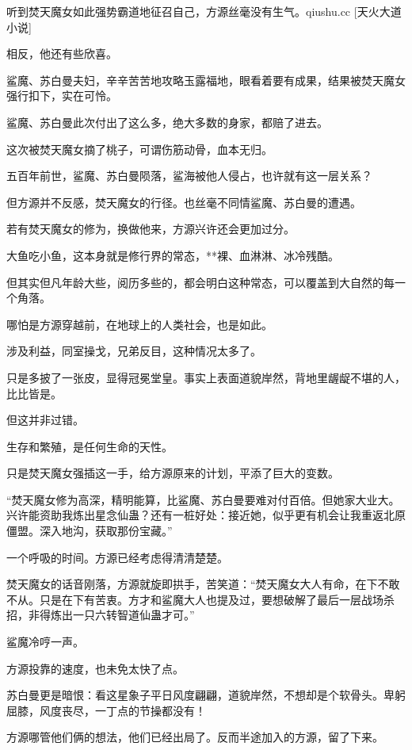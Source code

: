 
\begin{this_body}

听到焚天魔女如此强势霸道地征召自己，方源丝毫没有生气。qiushu.cc [天火大道小说]

相反，他还有些欣喜。

鲨魔、苏白曼夫妇，辛辛苦苦地攻略玉露福地，眼看着要有成果，结果被焚天魔女强行扣下，实在可怜。

鲨魔、苏白曼此次付出了这么多，绝大多数的身家，都赔了进去。

这次被焚天魔女摘了桃子，可谓伤筋动骨，血本无归。

五百年前世，鲨魔、苏白曼陨落，鲨海被他人侵占，也许就有这一层关系？

但方源并不反感，焚天魔女的行径。也丝毫不同情鲨魔、苏白曼的遭遇。

若有焚天魔女的修为，换做他来，方源兴许还会更加过分。

大鱼吃小鱼，这本身就是修行界的常态，**裸、血淋淋、冰冷残酷。

但其实但凡年龄大些，阅历多些的，都会明白这种常态，可以覆盖到大自然的每一个角落。

哪怕是方源穿越前，在地球上的人类社会，也是如此。

涉及利益，同室操戈，兄弟反目，这种情况太多了。

只是多披了一张皮，显得冠冕堂皇。事实上表面道貌岸然，背地里龌龊不堪的人，比比皆是。

但这并非过错。

生存和繁殖，是任何生命的天性。

只是焚天魔女强插这一手，给方源原来的计划，平添了巨大的变数。

“焚天魔女修为高深，精明能算，比鲨魔、苏白曼要难对付百倍。但她家大业大。兴许能资助我炼出星念仙蛊？还有一桩好处：接近她，似乎更有机会让我重返北原僵盟。深入地沟，获取那份宝藏。”

一个呼吸的时间。方源已经考虑得清清楚楚。

焚天魔女的话音刚落，方源就旋即拱手，苦笑道：“焚天魔女大人有命，在下不敢不从。只是在下有苦衷。方才和鲨魔大人也提及过，要想破解了最后一层战场杀招，非得炼出一只六转智道仙蛊才可。”

鲨魔冷哼一声。

方源投靠的速度，也未免太快了点。

苏白曼更是暗恨：看这星象子平日风度翩翩，道貌岸然，不想却是个软骨头。卑躬屈膝，风度丧尽，一丁点的节操都没有！

方源哪管他们俩的想法，他们已经出局了。反而半途加入的方源，留了下来。


\end{this_body}
